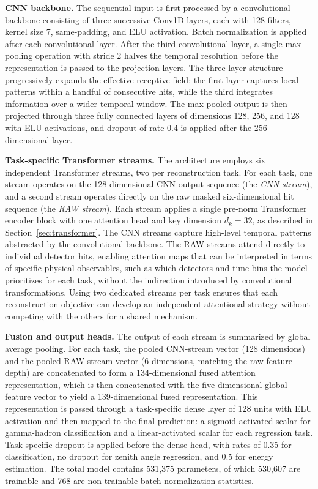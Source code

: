 \textbf{CNN backbone.} The sequential input is first processed by a convolutional backbone consisting of three successive Conv1D layers, each with 128 filters, kernel size 7, same-padding, and ELU activation. Batch normalization is applied after each convolutional layer. After the third convolutional layer, a single max-pooling operation with stride 2 halves the temporal resolution before the representation is passed to the projection layers. The three-layer structure progressively expands the effective receptive field: the first layer captures local patterns within a handful of consecutive hits, while the third integrates information over a wider temporal window. The max-pooled output is then projected through three fully connected layers of dimensions 128, 256, and 128 with ELU activations, and dropout of rate 0.4 is applied after the 256-dimensional layer.

\textbf{Task-specific Transformer streams.} The architecture employs six independent Transformer streams, two per reconstruction task. For each task, one stream operates on the 128-dimensional CNN output sequence (the \textit{CNN stream}), and a second stream operates directly on the raw masked six-dimensional hit sequence (the \textit{RAW stream}). Each stream applies a single pre-norm Transformer encoder block with one attention head and key dimension $d_k = 32$, as described in Section~\ref{sec:transformer}. The CNN streams capture high-level temporal patterns abstracted by the convolutional backbone. The RAW streams attend directly to individual detector hits, enabling attention maps that can be interpreted in terms of specific physical observables, such as which detectors and time bins the model prioritizes for each task, without the indirection introduced by convolutional transformations. Using two dedicated streams per task ensures that each reconstruction objective can develop an independent attentional strategy without competing with the others for a shared mechanism.

\textbf{Fusion and output heads.} The output of each stream is summarized by global average pooling. For each task, the pooled CNN-stream vector (128 dimensions) and the pooled RAW-stream vector (6 dimensions, matching the raw feature depth) are concatenated to form a 134-dimensional fused attention representation, which is then concatenated with the five-dimensional global feature vector to yield a 139-dimensional fused representation. This representation is passed through a task-specific dense layer of 128 units with ELU activation and then mapped to the final prediction: a sigmoid-activated scalar for gamma-hadron classification and a linear-activated scalar for each regression task. Task-specific dropout is applied before the dense head, with rates of 0.35 for classification, no dropout for zenith angle regression, and 0.5 for energy estimation. The total model contains 531,375 parameters, of which 530,607 are trainable and 768 are non-trainable batch normalization statistics.

